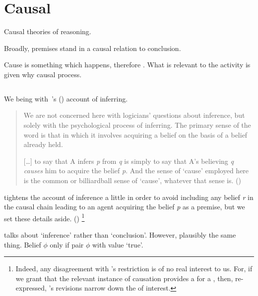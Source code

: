 \section{Causal}
\label{cha:lit:causal}

\begin{note}
  Causal theories of reasoning.

  Broadly, premises stand in a causal relation to conclusion.

  Cause is something which happens, therefore \wit{}.
  What is relevant to the activity is given why causal process.
\end{note}

\subsection*{\textcite{Armstrong:1968vh}}

\begin{note}
  We being with~\cite{Armstrong:1968vh}'s (\citeyear{Armstrong:1968vh}) account of inferring.

  \begin{quote}
    We are not concerned here with logicians' questions about inference, but solely with the psychological process of inferring.
    The primary sense of the word is that in which it involves acquiring a belief on the basis of a belief already held.

    [\dots] to say that A infers \emph{p} from \emph{q} is simply to say that A's believing \emph{q} \emph{causes} him to acquire the belief \emph{p}.
    And the sense of `cause' employed here is the common or billiardball sense of `cause', whatever that sense is.%
    \mbox{}\hfill\mbox{(\citeyear[194]{Armstrong:1968vh})}
  \end{quote}

  \citeauthor{Armstrong:1968vh} tightens the account of inference a little in order to avoid including any belief \emph{r} in the causal chain leading to an agent acquiring the belief \emph{p} as a premise, but we set these details aside.
  (\citeyear[195--197]{Armstrong:1968vh})%
  \footnote{
    Indeed, any disagreement with \citeauthor{Armstrong:1968vh}'s restriction is of no real interest to us.
    For, if we grant that the relevant instance of causation provides a \wit{} for a \ros{}, then, re-expressed, \citeauthor{Armstrong:1968vh}'s revisions narrow down the  of interest.
  }

  \citeauthor{Armstrong:1968vh} talks about `inference' rather than `conclusion'.
  However, plausibly the same thing.
  Belief \(\phi\) only if pair \(\phi\) with value `true'.
\end{note}

